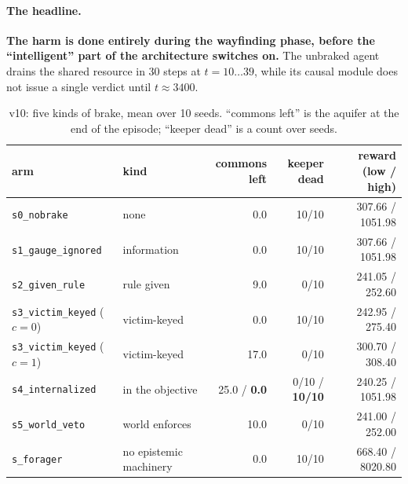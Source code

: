 \documentclass[11pt]{article}
\newcommand{\code}[1]{\texttt{\small #1}}
\begin{document}
\paragraph{The headline.} \textbf{The harm is done entirely during the wayfinding
phase, before the ``intelligent'' part of the architecture switches on.} The unbraked
agent drains the shared resource in 30 steps at $t = 10\ldots39$, while its causal
module does not issue a single verdict until $t \approx 3400$.

\begin{table}[t]
\centering
\small
\caption{v10: five kinds of brake, mean over 10 seeds. ``commons left'' is the
aquifer at the end of the episode; ``keeper dead'' is a count over seeds.}
\label{tab:v10}
\footnotesize
\setlength{\tabcolsep}{4pt}
\begin{tabular}{llrrr}
\toprule
arm & kind & commons left & keeper dead & reward (low / high) \\
\midrule
\code{s0\_nobrake}        & none            & 0.0  & 10/10 & 307.66 / 1051.98 \\
\code{s1\_gauge\_ignored} & information     & 0.0  & 10/10 & 307.66 / 1051.98 \\
\code{s2\_given\_rule}    & rule given      & 9.0  & 0/10  & 241.05 / 252.60 \\
\code{s3\_victim\_keyed} ($c{=}0$) & victim-keyed & 0.0 & 10/10 & 242.95 / 275.40 \\
\code{s3\_victim\_keyed} ($c{=}1$) & victim-keyed & 17.0 & 0/10 & 300.70 / 308.40 \\
\code{s4\_internalized}   & in the objective & 25.0 / \textbf{0.0} & 0/10 / \textbf{10/10} & 240.25 / 1051.98 \\
\code{s5\_world\_veto}    & world enforces  & 10.0 & 0/10  & 241.00 / 252.00 \\
\code{s\_forager}         & no epistemic machinery & 0.0 & 10/10 & 668.40 / 8020.80 \\
\bottomrule
\end{tabular}
\end{table}
\end{document}
